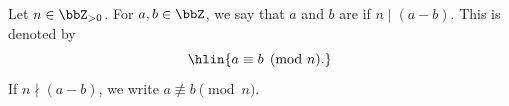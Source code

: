 \begin{definition} \label{definition:congruence_modulo_n}
    Let $n \in \bbZ_{>0}$. For $a, b \in \bbZ$, we say that $a$ and $b$ are  if $n \mid (a - b)$. This is denoted by
    $$\hlin{a \equiv b \pmod{n}.}$$
    If $n \nmid (a - b)$, we write $a \not\equiv b \pmod{n}$.
\end{definition}
